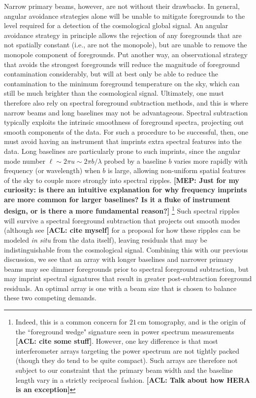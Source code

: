 \documentclass[twolcolumn,apj,iop,numberedappendix]{emulateapj}
\newcommand{\acl}[1]{{\color{red} \textbf{[ACL:  #1]}}}
\newcommand{\mep}[1]{{\color{applegreen} \textbf{[MEP:  #1]}}}
\begin{document}
Narrow primary beams, however, are not without their drawbacks. In general, angular avoidance strategies alone will be unable to mitigate foregrounds to the level required for a detection of the cosmological global signal. An angular avoidance strategy in principle allows the rejection of any foregrounds that are not spatially constant (i.e., are not the monopole), but are unable to remove the monopole component of foregrounds. Put another way, an observational strategy that avoids the strongest foregrounds will reduce the magnitude of foreground contamination considerably, but will at best only be able to reduce the contamination to the minimum foreground temperature on the sky, which can still be much brighter than the cosmological signal. Ultimately, one must therefore also rely on spectral foreground subtraction methods, and this is where narrow beams and long baselines may not be advantageous. Spectral subtraction typically exploits the intrinsic smoothness of foreground spectra, projecting out smooth components of the data. For such a procedure to be successful, then, one must avoid having an instrument that imprints extra spectral features into the data. Long baselines are particularly prone to such imprints, since the angular mode number $\ell \sim 2 \pi u \sim 2 \pi b / \lambda$ probed by a baseline $b$ varies more rapidly with frequency (or wavelength) when $b$ is large, allowing non-uniform spatial features of the sky to couple more strongly into spectral ripples. \mep{Just for my curiosity: is there an intuitive explanation for why frequency imprints are more common for larger baselines? Is it a fluke of instrument design, or is there a more fundamental reason?} \footnote{Indeed, this is a common concern for $21\,\textrm{cm}$ tomography, and is the origin of the ``foreground wedge" signature seen in power spectrum measurements\acl{cite some stuff}. However, one key difference is that most interferometer arrays targeting the power spectrum are not tightly packed (though they do tend to be quite compact). Such arrays are therefore not subject to our constraint that the primary beam width and the baseline length vary in a strictly reciprocal fashion. \acl{Talk about how HERA is an exception}} Such spectral ripples will survive a spectral foreground subtraction that projects out smooth modes (although see \acl{cite myself} for a proposal for how these ripples can be modeled \emph{in situ} from the data itself), leaving residuals that may be indistinguishable from the cosmological signal. Combining this with our previous discussion, we see that an array with longer baselines and narrower primary beams may see dimmer foregrounds prior to spectral foreground subtraction, but may imprint spectral signatures that result in greater post-subtraction foreground residuals. An optimal array is one with a beam size that is chosen to balance these two competing demands.
\end{document}
